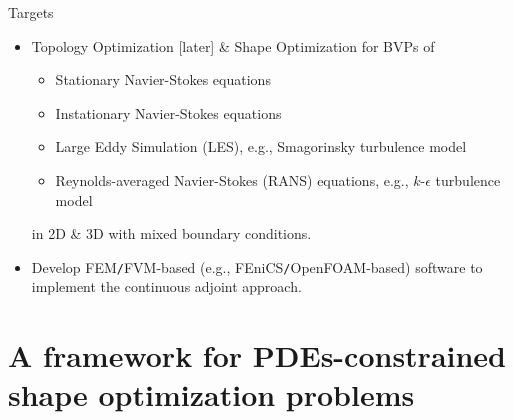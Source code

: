 \documentclass[10pt
hyperref={
    pdfauthor={Hong Quan Ba Nguyen},
    pdftitle={Optimal Shape Design of Air Ducts in Combustion Engines: Design a General Framework},
    pdfsubject={Talk},
    pdfcreator={LaTeX},
}
]{beamer}
\begin{document}
\begin{frame}{Targets}
    \begin{itemize}
        \item Topology Optimization [later] {\small\&} Shape Optimization for BVPs of
        \begin{itemize}
            \item Stationary Navier-Stokes equations
            \item Instationary Navier-Stokes equations
            \item Large Eddy Simulation (LES), e.g., Smagorinsky turbulence model
            \item Reynolds-averaged Navier-Stokes (RANS) equations, e.g., $k$-$\epsilon$ turbulence model \cite{MP1994}
        \end{itemize}
        in 2D {\small\&} 3D with mixed boundary conditions.
        \item Develop FEM\texttt{/}FVM-based (e.g., FEniCS\texttt{/}OpenFOAM-based) software to implement the continuous adjoint approach.
    \end{itemize}
\end{frame}

\section{A framework for PDEs-constrained shape optimization problems}
\end{document}
